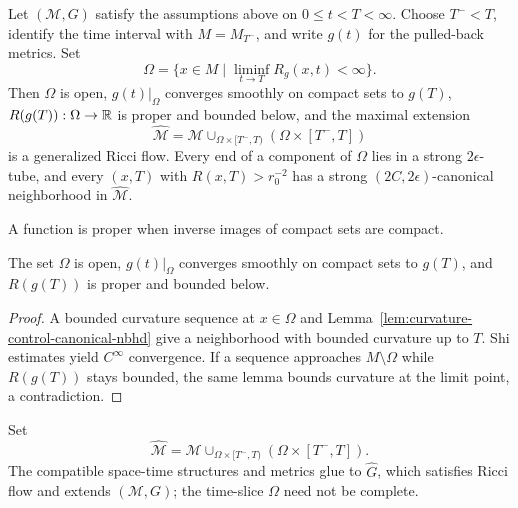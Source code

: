 \begin{theorem}
\label{thm:singular-time-limit-properties}\label{omega}

Let $({\mathcal M},G)$ satisfy the assumptions above on $0\le t<T<\infty$.
Choose $T^-<T$, identify the time interval with $M=M_{T^-}$, and write
$g(t)$ for the pulled-back metrics. Set
$$\Omega=\{x\in M\mid\liminf_{t\to T}R_g(x,t)<\infty\}.$$
Then $\Omega$ is open, $g(t)|_\Omega$ converges smoothly on compact sets to
$g(T)$, $R(g(T)):\Omega\to\mathbb{R}$ is proper and bounded below, and the maximal
extension
$$\widehat{\mathcal M}={\mathcal M}\cup_{\Omega\times[T^-,T)}
(\Omega\times[T^-,T])$$
is a generalized Ricci flow. Every end of a component of $\Omega$ lies in a
strong $2\epsilon$-tube, and every $(x,T)$ with $R(x,T)>r_0^{-2}$ has a
strong $(2C,2\epsilon)$-canonical neighborhood in $\widehat{\mathcal M}$.
\end{theorem}
\begin{remark}\label{rem:proper-function}
A function is proper when inverse images of compact sets are compact.
\end{remark}

\begin{lemma}
\label{lem:omega-open-limit-metric}\label{Rproper}

The set $\Omega$ is open, $g(t)|_\Omega$ converges smoothly on compact sets
to $g(T)$, and $R(g(T))$ is proper and bounded below.
\end{lemma}
\begin{proof}\sketch A bounded
curvature sequence at $x\in\Omega$ and Lemma~\ref{lem:curvature-control-canonical-nbhd}
give a neighborhood with bounded curvature up to $T$. Shi estimates yield
$C^\infty$ convergence. If a sequence approaches $M\setminus\Omega$ while
$R(g(T))$ stays bounded, the same lemma bounds curvature at the limit point,
a contradiction.\end{proof}

\begin{definition}
\label{def:maximal-extension-to-time-T}\label{hatM}

Set
$$\widehat {\mathcal M}= {\mathcal M}\cup_{\Omega\times[T^-,T)}
(\Omega\times[T^-,T]).$$
The compatible space-time structures and metrics glue to $\widehat G$,
which satisfies Ricci flow and extends $({\mathcal M},G)$; the time-slice
$\Omega$ need not be complete.
\end{definition}

